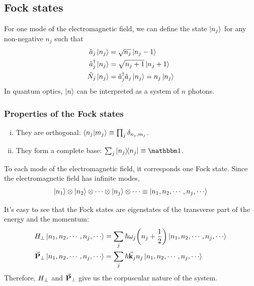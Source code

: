 \subsection{Fock states}
\begin{defi}
	For one mode of the electromagnetic field, we can define the state $\ket{n_{j}}$ for any non-negative $n_{j}$ such that
	\begin{subequations}
	\begin{align}
		\hat{a}_{j} \ket{n_{j}} &= \sqrt{n_{j}}\ket{n_{j} - 1} \\
		\hat{a}_{j}^{\dagger}{} \ket{n_{j}} &= \sqrt{n_{j} + 1}\ket{n_{j} + 1} \\
		\hat{N}_{j} \ket{n_{j}} &= \hat{a}_{j}^{\dagger}{} \hat{a}_{j} \ket{n_{j}} = n_{j} \ket{n_{j}}
	\end{align}
	\end{subequations}
	In quantum optics, $\ket{n}$ can be interpreted as a system of $n$ photons.
\end{defi}

\subsubsection*{Properties of the Fock states}
\begin{enumerate}[i)]
	\item They are orthogonal: $\braket{n_{j}}{m_{j}} \equiv \prod_{j} \delta_{n_{j},m_{j}}$.
	\item They form a complete base: $\sum_{j} \dyad{n_{j}}{n_{j}} \equiv \bbid$.
\end{enumerate}

To each mode of the electromagnetic field, it corresponds one Fock state. Since the electromagnetic field has infinite modes,
\begin{align*}
	\ket{n_{1}} \otimes \ket{n_{2}} \otimes \cdots \otimes \ket{n_{j}} \otimes \cdots \equiv \ket{n_{1}, n_{2}, \cdots, n_{j}, \cdots}
\end{align*}

It's easy to see that the Fock states are eigenstates of the transverse part of the energy and the momentum:
\begin{subequations}
\begin{align}
	{H}_{\perp} \ket{n_{1}, n_{2}, \cdots, n_{j}, \cdots} &= \sum_{j} \hbar \omega_{j} \qty(n_{j} + \frac{1}{2} ) \ket{n_{1}, n_{2}, \cdots, n_{j}, \cdots} \\
	{\va{P}}_{\perp} \ket{n_{1}, n_{2}, \cdots, n_{j}, \cdots} &= \sum_{j} \hbar \va{k}_{j} n_{j} \ket{n_{1}, n_{2}, \cdots, n_{j}, \cdots}
\end{align}
\end{subequations}
Therefore, ${H}_{\perp}$ and ${\va{P}}_{\perp}$ give us the corpuscular nature of the system.

